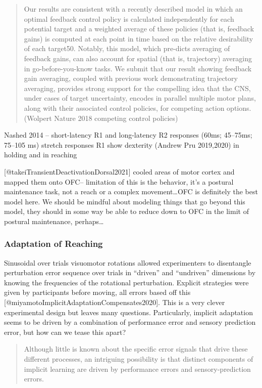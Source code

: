 \begin{quote}
Our results are consistent with a recently described model in which an
optimal feedback control policy is calculated independently for each
potential target and a weighted average of these policies (that is,
feedback gains) is computed at each point in time based on the relative
desirability of each target50. Notably, this model, which pre-dicts
averaging of feedback gains, can also account for spatial (that is,
trajectory) averaging in go-before-you-know tasks. We submit that our
result showing feedback gain averaging, coupled with previous work
demonstrating trajectory averaging, provides strong support for the
compelling idea that the CNS, under cases of target uncertainty, encodes
in parallel multiple motor plans, along with their associated control
policies, for competing action options. (Wolpert Nature 2018 competing
control policies)
\end{quote}

Nashed 2014 -- short-latency R1 and long-latency R2 responses (60ms;
45--75ms; 75--105 ms) stretch responses R1 show dexterity (Andrew Pru
2019,2020) in holding and in reaching

{[}@takeiTransientDeactivationDorsal2021{]} cooled areas of motor cortex
and mapped them onto OFC-- limitation of this is the behavior, it's a
postural maintenance task, not a reach or a complex movement\ldots OFC
is definitely the best model here. We should be mindful about modeling
things that go beyond this model, they should in some way be able to
reduce down to OFC in the limit of postural maintenance, perhaps\ldots{}

\subsubsection{Adaptation of Reaching}\label{adaptation-of-reaching}

Sinusoidal over trials visuomotor rotations allowed experimenters to
disentangle perturbation error sequence over trials in ``driven'' and
``undriven'' dimensions by knowing the frequencies of the rotational
perturbation. Explicit strategies were given by participants before
moving, all errors based off this
{[}@miyamotoImplicitAdaptationCompensates2020{]}. This is a very clever
experimental design but leaves many questions. Particularly, implicit
adaptation seems to be driven by a combination of performance error and
sensory prediction error, but how can we tease this apart?

\begin{quote}
Although little is known about the specific error signals that drive
these different processes, an intriguing possibility is that distinct
components of implicit learning are driven by performance errors and
sensory-prediction errors.
\end{quote}

